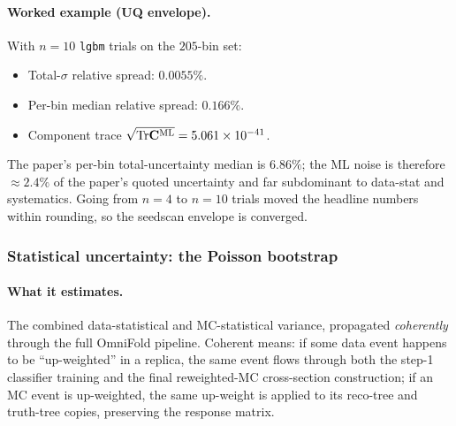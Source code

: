 \paragraph{Worked example (UQ envelope).}
With $n=10$ \texttt{lgbm} trials on the $205$-bin set:
\begin{itemize}[nosep]
  \item Total-$\sigma$ relative spread: $\boxed{0.0055\%}$.
  \item Per-bin median relative spread: $\boxed{0.166\%}$.
  \item Component trace $\sqrt{\mathrm{Tr}\mathbf{C}^{\text{ML}}} = 5.061\times10^{-41}$.
\end{itemize}
The paper's per-bin total-uncertainty median is $6.86\%$; the ML
noise is therefore $\approx 2.4\%$ of the paper's quoted uncertainty
and far subdominant to data-stat and systematics. Going from $n=4$ to
$n=10$ trials moved the headline numbers within rounding, so the
seedscan envelope is converged.

\subsubsection{Statistical uncertainty: the Poisson bootstrap}
\label{sec:bootstrap}

\paragraph{What it estimates.}
The combined data-statistical and MC-statistical variance, propagated
\emph{coherently} through the full OmniFold pipeline. Coherent means:
if some data event happens to be ``up-weighted'' in a replica, the
same event flows through both the step-1 classifier training and the
final reweighted-MC cross-section construction; if an MC event is
up-weighted, the same up-weight is applied to its reco-tree and
truth-tree copies, preserving the response matrix.


